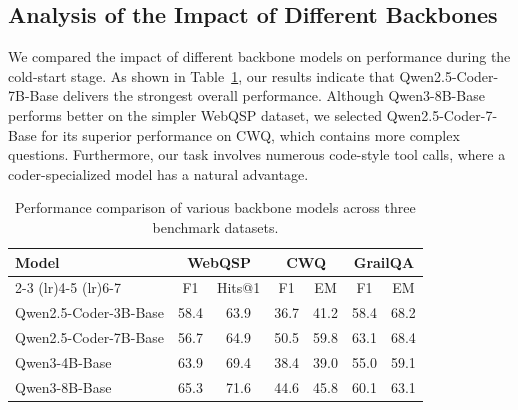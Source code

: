 \subsection{Analysis of the Impact of Different Backbones}
We compared the impact of different backbone models on performance during the cold-start stage. As shown in Table~\ref{tab:model_performance}, our results indicate that Qwen2.5-Coder-7B-Base delivers the strongest overall performance. Although Qwen3-8B-Base performs better on the simpler WebQSP dataset, we selected Qwen2.5-Coder-7-Base for its superior performance on CWQ, which contains more complex questions. Furthermore, our task involves numerous code-style tool calls, where a coder-specialized model has a natural advantage. 
\begin{table}
  \centering
  \caption{Performance comparison of various backbone models across three benchmark datasets.}
  \label{tab:model_performance}
  \begin{tabular}{lcccccc}
    \toprule
    \multirow{2}{*}{\textbf{Model}} & \multicolumn{2}{c}{\textbf{WebQSP}} & \multicolumn{2}{c}{\textbf{CWQ}} & \multicolumn{2}{c}{\textbf{GrailQA}} \\
    \cmidrule(lr){2-3} \cmidrule(lr){4-5} \cmidrule(lr){6-7}
    & F1   & Hits@1 & F1   & EM   & F1   & EM   \\
    \midrule
    Qwen2.5-Coder-3B-Base & 58.4 & 63.9 & 36.7 & 41.2 & 58.4 & 68.2 \\
    Qwen2.5-Coder-7B-Base & 56.7 & 64.9 & 50.5 & 59.8 & 63.1 & 68.4 \\
    Qwen3-4B-Base    & 63.9 & 69.4 & 38.4 & 39.0 & 55.0 & 59.1 \\
    Qwen3-8B-Base    & 65.3 & 71.6 & 44.6 & 45.8 & 60.1 & 63.1 \\
    \bottomrule
  \end{tabular}
\end{table}
